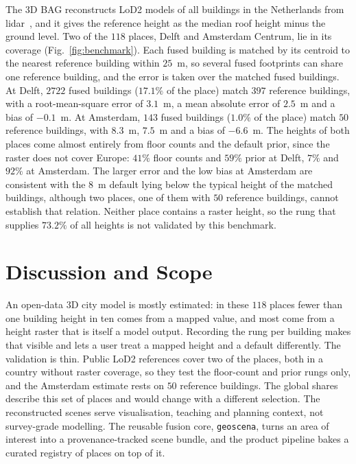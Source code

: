 \documentclass[journal]{IEEEtran}
\begin{document}
The 3D BAG reconstructs LoD2 models of all buildings in the Netherlands from lidar~\cite{peters}, and it gives the
reference height as the median roof height minus the ground level. Two of the $118$ places, Delft and Amsterdam
Centrum, lie in its coverage (Fig.~\ref{fig:benchmark}). Each fused building is matched by its centroid to the nearest
reference building within $25$~m, so several fused footprints can share one reference building, and the error is taken
over the matched fused buildings. At Delft, $2722$ fused buildings ($17.1\%$ of the place) match $397$ reference
buildings, with a root-mean-square error of $3.1$~m, a mean absolute error of $2.5$~m and a bias of $-0.1$~m. At
Amsterdam, $143$ fused buildings ($1.0\%$ of the place) match $50$ reference buildings, with $8.3$~m, $7.5$~m and a bias
of $-6.6$~m. The heights of both places come almost entirely from floor counts and the default prior, since the raster
does not cover
Europe: $41\%$ floor counts and $59\%$ prior at Delft, $7\%$ and $92\%$ at Amsterdam. The larger error and the low bias
at Amsterdam are consistent with the $8$~m default lying below the typical height of the matched buildings, although
two places, one of them with $50$ reference buildings, cannot establish that relation. Neither place contains a
raster height, so the rung that supplies $73.2\%$ of all heights is not validated by this benchmark.

\section{Discussion and Scope}\label{sec:discuss}

An open-data 3D city model is mostly estimated: in these $118$ places fewer than one building height in ten comes from
a mapped value, and most come from a height raster that is itself a model output. Recording the rung per building
makes that visible and lets a user treat a mapped height and a default differently. The validation is thin. Public
LoD2 references cover two of the places, both in a country without raster coverage, so they test the floor-count and
prior rungs only, and the Amsterdam estimate rests on $50$ reference buildings. The global shares describe this set of
places and would change with a different selection. The reconstructed scenes serve visualisation, teaching and
planning context, not survey-grade modelling. The reusable fusion core, \texttt{geoscena}, turns an area of interest
into a provenance-tracked scene bundle, and the product pipeline bakes a curated registry of places on top of it.
\end{document}

